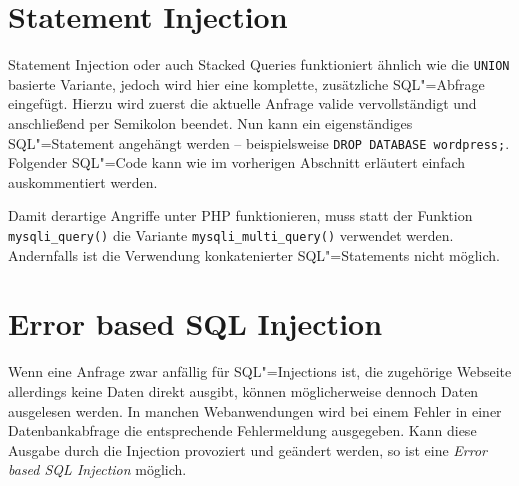 \section{Statement Injection}

{Statement Injection } oder auch Stacked Queries funktioniert ähnlich wie die \texttt{UNION} basierte Variante, jedoch wird hier eine komplette, zusätzliche SQL"=Abfrage eingefügt. Hierzu wird zuerst die aktuelle Anfrage valide vervollständigt und anschließend per Semikolon beendet. Nun kann ein eigenständiges SQL"=Statement angehängt werden -- beispielsweise \texttt{DROP DATABASE wordpress;}. Folgender SQL"=Code kann wie im vorherigen Abschnitt erläutert einfach auskommentiert werden.


Damit derartige Angriffe unter PHP funktionieren, muss statt der Funktion \texttt{mysqli_query()} die Variante \texttt{mysqli_multi_query()} verwendet werden. Andernfalls ist die Verwendung konkatenierter SQL"=Statements nicht möglich.


\section{Error based SQL Injection}

Wenn eine Anfrage zwar anfällig für SQL"=Injections ist, die zugehörige Webseite allerdings keine Daten direkt ausgibt, können möglicherweise dennoch Daten ausgelesen werden. In manchen Webanwendungen wird bei einem Fehler in einer Datenbankabfrage die entsprechende Fehlermeldung ausgegeben. Kann diese Ausgabe durch die Injection provoziert und geändert werden, so ist eine \emph{Error based SQL Injection} möglich.


\begin{listing}
\begin{margincap}
\inputminted[startinline,obeytabs]{php}{imports/cp_multi_error.php}
\caption[cp multi view calendar]{Ein Auszug aus dem Wordpress"=Plugin \texttt{cp multi view calendar}\footnote{\url{https://github.com/wp-plugins/cp-multi-view-calendar}}. Die Variable \texttt{id} wird nicht überprüft und ermöglicht so SQL"=Injections. Im Fehlerfall wird die Meldung in Zeile 7 in eine lokale Variable geschrieben und später ausgegeben.}
\label{lst:cp_multi_error}
\end{margincap}
\end{listing}

